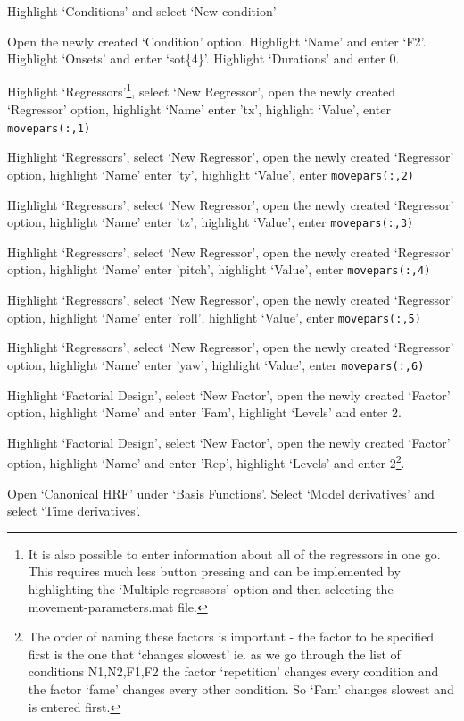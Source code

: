 \documentclass[a4paper,titlepage]{book}
\begin{document}
\item{Highlight `Conditions' and select `New condition'}
\item{Open the newly created `Condition' option. Highlight `Name' and enter `F2'. Highlight `Onsets' and enter `sot\{4\}'. Highlight `Durations' and enter 0.}
\item{Highlight `Regressors'\footnote{It is also possible to enter information about all of the regressors in one go. This requires much less button pressing and can be implemented by highlighting the `Multiple regressors' option and then
selecting the {\sf movement-parameters.mat} file.}, select `New Regressor', open the newly created `Regressor' option, highlight `Name' enter 'tx', highlight `Value', enter \verb!movepars(:,1)!}
\item{Highlight `Regressors', select `New Regressor', open the newly created `Regressor' option, highlight `Name' enter 'ty', highlight `Value', enter \verb!movepars(:,2)!}
\item{Highlight `Regressors', select `New Regressor', open the newly created `Regressor' option, highlight `Name' enter 'tz', highlight `Value', enter \verb!movepars(:,3)!}
\item{Highlight `Regressors', select `New Regressor', open the newly created `Regressor' option, highlight `Name' enter 'pitch', highlight `Value', enter \verb!movepars(:,4)!}
\item{Highlight `Regressors', select `New Regressor', open the newly created `Regressor' option, highlight `Name' enter 'roll', highlight `Value', enter \verb!movepars(:,5)!}
\item{Highlight `Regressors', select `New Regressor', open the newly created `Regressor' option, highlight `Name' enter 'yaw', highlight `Value', enter \verb!movepars(:,6)!}
\item{Highlight `Factorial Design', select `New Factor', open the newly created `Factor' option, highlight `Name' and enter 'Fam', highlight `Levels' and enter 2.}
\item{Highlight `Factorial Design', select `New Factor', open the newly created `Factor' option, highlight `Name' and enter 'Rep', highlight `Levels' and enter 2\footnote{The order of naming these factors is important - the factor to be specified first is the one that `changes slowest' ie. as we go through the list of conditions N1,N2,F1,F2 the factor `repetition' changes every condition and the 
factor `fame' changes every other condition. So `Fam' changes slowest and is entered first.}.}
\item{Open `Canonical HRF' under `Basis Functions'. Select `Model derivatives' and select `Time derivatives'.}
\end{document}
